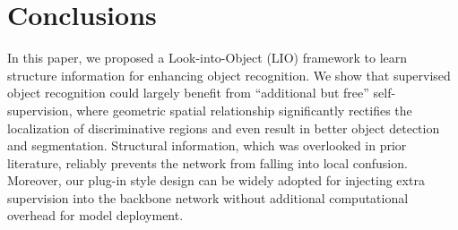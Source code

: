 \documentclass[10pt,twocolumn,letterpaper]{article}
\begin{document}
\section{Conclusions} \label{sec:conclusion}
In this paper, we proposed a Look-into-Object (LIO) framework to learn structure information for enhancing object recognition. We show that supervised object recognition could largely benefit from ``additional but free'' self-supervision, where geometric spatial relationship significantly rectifies the localization of discriminative regions and even result in better object detection and segmentation. Structural information, which was overlooked in prior literature, reliably prevents the network from falling into local confusion. Moreover, our plug-in style design can be widely adopted for injecting extra supervision into the backbone network without additional computational overhead for model deployment.
{\small


}
\end{document}
